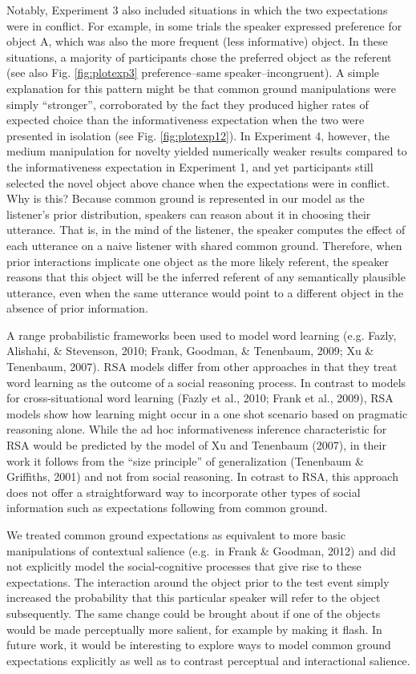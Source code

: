 \documentclass[10pt, letterpaper]{article}
\begin{document}
Notably, Experiment 3 also included situations in which the two
expectations were in conflict. For example, in some trials the speaker
expressed preference for object A, which was also the more frequent
(less informative) object. In these situations, a majority of
participants chose the preferred object as the referent (see also Fig.
\ref{fig:plotexp3} preference--same speaker--incongruent). A simple
explanation for this pattern might be that common ground manipulations
were simply ``stronger'', corroborated by the fact they produced higher
rates of expected choice than the informativeness expectation when the
two were presented in isolation (see Fig. \ref{fig:plotexp12}). In
Experiment 4, however, the medium manipulation for novelty yielded
numerically weaker results compared to the informativeness expectation
in Experiment 1, and yet participants still selected the novel object
above chance when the expectations were in conflict. Why is this?
Because common ground is represented in our model as the listener's
prior distribution, speakers can reason about it in choosing their
utterance. That is, in the mind of the listener, the speaker computes
the effect of each utterance on a naive listener with shared common
ground. Therefore, when prior interactions implicate one object as the
more likely referent, the speaker reasons that this object will be the
inferred referent of any semantically plausible utterance, even when the
same utterance would point to a different object in the absence of prior
information.

A range probabilistic frameworks been used to model word learning (e.g.
Fazly, Alishahi, \& Stevenson, 2010; Frank, Goodman, \& Tenenbaum, 2009;
Xu \& Tenenbaum, 2007). RSA models differ from other approaches in that
they treat word learning as the outcome of a social reasoning process.
In contrast to models for cross-situational word learning (Fazly et al.,
2010; Frank et al., 2009), RSA models show how learning might occur in a
one shot scenario based on pragmatic reasoning alone. While the ad hoc
informativeness inference characteristic for RSA would be predicted by
the model of Xu and Tenenbaum (2007), in their work it follows from the
``size principle'' of generalization (Tenenbaum \& Griffiths, 2001) and
not from social reasoning. In cotrast to RSA, this approach does not
offer a straightforward way to incorporate other types of social
information such as expectations following from common ground.

We treated common ground expectations as equivalent to more basic
manipulations of contextual salience (e.g.~in Frank \& Goodman, 2012)
and did not explicitly model the social-cognitive processes that give
rise to these expectations. The interaction around the object prior to
the test event simply increased the probability that this particular
speaker will refer to the object subsequently. The same change could be
brought about if one of the objects would be made perceptually more
salient, for example by making it flash. In future work, it would be
interesting to explore ways to model common ground expectations
explicitly as well as to contrast perceptual and interactional salience.
\end{document}
